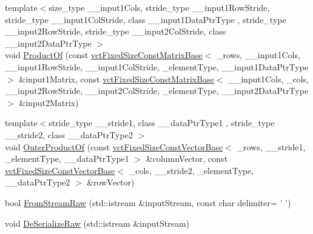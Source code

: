 \begin{DoxyCompactItemize}
{\footnotesize template$<$size\-\_\-type \-\_\-\-\_\-input1\-Cols, stride\-\_\-type \-\_\-\-\_\-input1\-Row\-Stride, stride\-\_\-type \-\_\-\-\_\-input1\-Col\-Stride, class \-\_\-\-\_\-input1\-Data\-Ptr\-Type , stride\-\_\-type \-\_\-\-\_\-input2\-Row\-Stride, stride\-\_\-type \-\_\-\-\_\-input2\-Col\-Stride, class \-\_\-\-\_\-input2\-Data\-Ptr\-Type $>$ }\\void \hyperlink{classvct_fixed_size_matrix_base_a1bbcba8e1551687b52b829189803601f}{Product\-Of} (const \hyperlink{classvct_fixed_size_const_matrix_base}{vct\-Fixed\-Size\-Const\-Matrix\-Base}$<$ \-\_\-rows, \-\_\-\-\_\-input1\-Cols, \-\_\-\-\_\-input1\-Row\-Stride, \-\_\-\-\_\-input1\-Col\-Stride, \-\_\-element\-Type, \-\_\-\-\_\-input1\-Data\-Ptr\-Type $>$ \&input1\-Matrix, const \hyperlink{classvct_fixed_size_const_matrix_base}{vct\-Fixed\-Size\-Const\-Matrix\-Base}$<$ \-\_\-\-\_\-input1\-Cols, \-\_\-cols, \-\_\-\-\_\-input2\-Row\-Stride, \-\_\-\-\_\-input2\-Col\-Stride, \-\_\-element\-Type, \-\_\-\-\_\-input2\-Data\-Ptr\-Type $>$ \&input2\-Matrix)
\item 
{\footnotesize template$<$stride\-\_\-type \-\_\-\-\_\-stride1, class \-\_\-\-\_\-data\-Ptr\-Type1 , stride\-\_\-type \-\_\-\-\_\-stride2, class \-\_\-\-\_\-data\-Ptr\-Type2 $>$ }\\void \hyperlink{classvct_fixed_size_matrix_base_afecb97a2b33c3de227df55cbe2508ad7}{Outer\-Product\-Of} (const \hyperlink{classvct_fixed_size_const_vector_base}{vct\-Fixed\-Size\-Const\-Vector\-Base}$<$ \-\_\-rows, \-\_\-\-\_\-stride1, \-\_\-element\-Type, \-\_\-\-\_\-data\-Ptr\-Type1 $>$ \&column\-Vector, const \hyperlink{classvct_fixed_size_const_vector_base}{vct\-Fixed\-Size\-Const\-Vector\-Base}$<$ \-\_\-cols, \-\_\-\-\_\-stride2, \-\_\-element\-Type, \-\_\-\-\_\-data\-Ptr\-Type2 $>$ \&row\-Vector)
\item 
bool \hyperlink{classvct_fixed_size_matrix_base_a39b44103dc07f56c33508303eed6aa11}{From\-Stream\-Raw} (std\-::istream \&input\-Stream, const char delimiter= ' ')
\item 
void \hyperlink{classvct_fixed_size_matrix_base_a0d00295ad8c1e71125f389767e342f98}{De\-Serialize\-Raw} (std\-::istream \&input\-Stream)
\end{DoxyCompactItemize}
